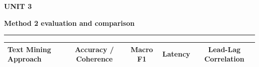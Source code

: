 \documentclass[aspectratio=169, 10pt]{beamer}
\newcommand{\slideheader}[3]{%
        \vspace{-0.25cm}%
        \noindent\begin{minipage}[t]{0.88\linewidth}%
            {\fontsize{7pt}{8.5pt}\selectfont \textbf{\color{BlueAccent}#1}}\par\vspace{1pt}%
            {\fontsize{11.5pt}{13.5pt}\selectfont \textbf{\color{NavyPrimary}#2}}%
        \end{minipage}%
        \hfill%
        \begin{minipage}[t]{0.10\linewidth}%
            \raggedleft{\fontsize{12pt}{14pt}\selectfont \textbf{\color{CoralAccent}#3}}%
        \end{minipage}\par%
        \vspace{2pt}%
        \textcolor{CardBorder}{\rule{\linewidth}{0.6pt}}\par%
        \vspace{3pt}%
    }
\begin{document}
    \begin{frame}[t]                                                                                                                                                                                   
        \slideheader{UNIT 3}{Method 2 evaluation and comparison}{13}                                                                                                                                   
        \vspace{-0.1cm}                                                                                                                                                                                
        \begin{table}[h]                                                                                                                                                                               
            \centering\scriptsize                                                                                                                                                                      
            \begin{tabular}{lcccc}                                                                                                                                                                     
                \toprule                                                                                                                                                                               
                \rowcolor{NavyPrimary!15} \textbf{Text Mining Approach} & \textbf{Accuracy / Coherence} & \textbf{Macro F1} & \textbf{Latency} & \textbf{Lead-Lag Correlation} \\                      
                \midrule                                                                                                                                                                               

\end{tabular}
\end{table}
\end{frame}
\end{document}
